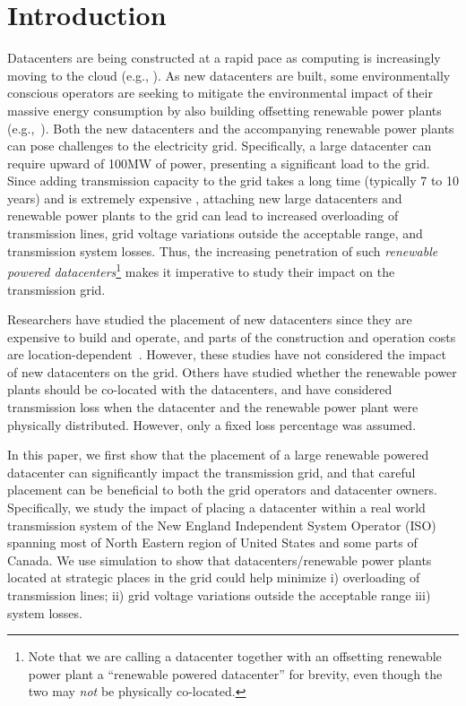 \section{Introduction}
\label{sec:intro}

Datacenters are being constructed at a rapid pace as computing is increasingly moving to the cloud (e.g., \cite{}).  As new datacenters are built, some environmentally conscious operators are seeking to mitigate the environmental impact of their massive energy consumption by also building offsetting renewable power plants (e.g.,~\cite{GoogleGreen,Apple13,McGrawHill11}).  Both the new datacenters and the accompanying renewable power plants can pose challenges to the electricity grid.  Specifically, a large datacenter can require upward of 100MW of power, presenting a significant load to the grid.  Since adding transmission capacity to the grid takes a long time (typically 7 to 10 years) and is extremely expensive , attaching new large datacenters and renewable power plants to the grid can lead to increased overloading of transmission lines, grid voltage variations outside the acceptable range, and transmission system losses.  Thus, the increasing penetration of such {\em renewable powered datacenters}\footnote{Note that we are calling a datacenter together with an offsetting renewable power plant a ``renewable powered datacenter'' for brevity, even though the two may {\em not} be physically co-located.} makes it imperative to study their impact on the transmission grid.

Researchers have studied the placement of new datacenters since they are expensive to build and operate, and parts of the construction and operation costs are location-dependent~\cite{Goiri11place,Dalger05,Boley09,larumbe2012optimal,berral2014building}.  However, these studies have not considered the impact of new datacenters on the grid.  Others have studied whether the renewable power plants should be co-located with the datacenters\cite{}, and have considered transmission loss when the datacenter and the renewable power plant were physically distributed.  However, only a fixed loss percentage was assumed.

In this paper, we first show that the placement of a large renewable powered datacenter can significantly impact the transmission grid, and that careful placement can be beneficial to both the grid operators and datacenter owners.  Specifically, we study the impact of placing a datacenter within a real world transmission system of the New England Independent System Operator (ISO) spanning most of North Eastern region of United States and some parts of Canada.  We use simulation to show that datacenters/renewable power plants located at strategic places in the grid could help minimize i) overloading of transmission lines; ii) grid voltage variations outside the acceptable range iii) system losses.

